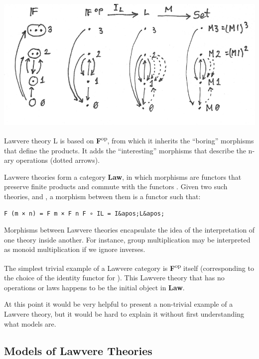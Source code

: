 \hypertarget{attachment_9070}{}
\includegraphics[width=5.31250in]{images/lawvere1.png}

Lawvere theory L is based on \textbf{F}\textsuperscript{op}, from which
it inherits the ``boring'' morphisms that define the products. It adds
the ``interesting'' morphisms that describe the n-ary operations (dotted
arrows).

Lavwere theories form a category \textbf{Law}, in which morphisms are
functors that preserve finite products and commute with the functors
. Given two such theories,  and
, a morphism between them is a
functor  such that:

\begin{verbatim}
F (m × n) = F m × F n F ∘ IL = I&apos;L&apos;
\end{verbatim}

Morphisms between Lawvere theories encapsulate the idea of the
interpretation of one theory inside another. For instance, group
multiplication may be interpreted as monoid multiplication if we ignore
inverses.

The simplest trivial example of a Lawvere category is
\textbf{F}\textsuperscript{op} itself (corresponding to the choice of
the identity functor for ). This Lawvere theory that has no
operations or laws happens to be the initial object in \textbf{Law}.

At this point it would be very helpful to present a non-trivial example
of a Lawvere theory, but it would be hard to explain it without first
understanding what models are.

\subsection{Models of Lawvere
Theories}\label{models-of-lawvere-theories}


